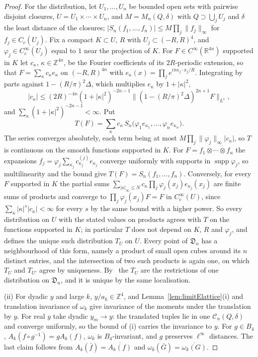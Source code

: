 \documentclass[aps,prd,twocolumn,superscriptaddress,nofootinbib,longbibliography,floatfix,amsmath,amssymb,10pt]{revtex4-2}
\theoremstyle{definition}
\theoremstyle{remark}
\newcommand{\R}{\mathbb{R}}
\newcommand{\Z}{\mathbb{Z}}
\begin{document}
\begin{proof}
For the distribution, let $U_1,\dots,U_n$ be bounded open sets with
pairwise disjoint closures, $U=U_1\times\cdots\times U_n$, and $M=M_n(Q,
\delta)$ with $Q\supset\bigcup_jU_j$ and $\delta$ the least distance of the
closures; $|S_n(f_1,\dots,f_n)|\le M\prod_j\|f_j\|_\infty$ for $f_j\in
C_c(U_j)$. Fix a compact $K\subset U$, $R$ with $U_j\subset(-R,R)^4$, and
$\varphi_j\in C^\infty_c(U_j)$ equal to $1$ near the projection of $K$. For
$F\in C^\infty(\R^{4n})$ supported in $K$ let $c_\kappa$, $\kappa\in
\Z^{4n}$, be the Fourier coefficients of its $2R$-periodic extension, so
that $F=\sum_\kappa c_\kappa e_\kappa$ on $(-R,R)^{4n}$ with $e_\kappa(x)=
\prod_je^{i\pi\kappa_j\cdot x_j/R}$. Integrating by parts against
$1-(R/\pi)^2\Delta$, which multiplies $e_\kappa$ by $1+|\kappa|^2$,
\[
|c_\kappa|\le(2R)^{-4n}(1+|\kappa|^2)^{-2n-1}\bigl\|(1-(R/\pi)^2\Delta)^{
2n+1}F\bigr\|_{L^1},
\]
and $\sum_\kappa(1+|\kappa|^2)^{-2n-1}<\infty$. Put
\[
T(F)=\sum_\kappa c_\kappa\,S_n\bigl(\varphi_1e_{\kappa_1},\dots,\varphi_n
e_{\kappa_n}\bigr) .
\]
The series converges absolutely, each term being at most $M\prod_j
\|\varphi_j\|_\infty|c_\kappa|$, so $T$ is continuous on the smooth
functions supported in $K$. For $F=f_1\otimes\cdots\otimes f_n$ the
expansions $f_j=\varphi_j\sum_{\kappa_j}c^{(j)}_{\kappa_j}e_{\kappa_j}$
converge uniformly with supports in $\operatorname{supp}\varphi_j$, so
multilinearity and the bound give $T(F)=S_n(f_1,\dots,f_n)$. Conversely,
for every $F$ supported in $K$ the partial sums
$\sum_{|\kappa|_\infty\le N}c_\kappa\prod_j\varphi_j(x_j)e_{\kappa_j}(x_j)$
are finite sums of products and converge to $\prod_j\varphi_j(x_j)F=F$ in
$C^\infty_c(U)$, since $\sum_\kappa|\kappa|^s|c_\kappa|<\infty$ for every
$s$ by the same bound with a higher power. So every distribution on $U$
with the stated values on products agrees with $T$ on the functions
supported in $K$; in particular $T$ does not depend on $K$, $R$ and
$\varphi_j$, and defines the unique such distribution $T_U$ on $U$. Every
point of $\mathfrak D_n$ has a neighbourhood of this form, namely a product
of small open cubes around its $n$ distinct entries, and the intersection of
two such products is again one, on which $T_U$ and $T_{U'}$ agree by
uniqueness. By~\cite[Sect.~2.2]{Hor03} the $T_U$ are the restrictions of one
distribution on $\mathfrak D_n$, and it is unique by the same localisation.

(ii) For dyadic $y$ and large $k$, $y/a_k\in\Z^4$, and
Lemma~\ref{lem:limitElattice}(i) and translation invariance of $\omega_k$
give invariance of the moments under the translation by $y$. For real $y$
take dyadic $y_m\to y$: the translated tuples lie in one $\mathcal
C_n(Q,\delta)$ and converge uniformly, so the bound of (i) carries the
invariance to $y$. For $g\in B_4$, $A_k(f\circ g^{-1})=gA_k(f)$, $\omega_k$
is $B_4$-invariant, and $g$ preserves $\ell^\infty$ distances. The last
claim follows from $A_k(\bar f)=\overline{A_k(f)}$ and $\omega_k(\bar G)=
\overline{\omega_k(G)}$.


\end{proof}
\end{document}
